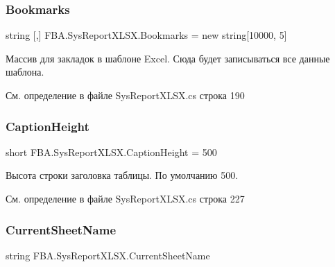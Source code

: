 \subsubsection{\texorpdfstring{Bookmarks}{Bookmarks}}
{\footnotesize\ttfamily string \mbox{[},\mbox{]} F\+B\+A.\+Sys\+Report\+X\+L\+S\+X.\+Bookmarks = new string\mbox{[}10000, 5\mbox{]}}



Массив для закладок в шаблоне Excel. Сюда будет записываться все данные шаблона. ~\newline
 



См. определение в файле Sys\+Report\+X\+L\+S\+X.\+cs строка 190

\mbox{\label{class_f_b_a_1_1_sys_report_x_l_s_x_a79c24ff3b7d11a7764ff00fe38c2af2f}} 
\subsubsection{\texorpdfstring{Caption\+Height}{CaptionHeight}}
{\footnotesize\ttfamily short F\+B\+A.\+Sys\+Report\+X\+L\+S\+X.\+Caption\+Height = 500}



Высота строки заголовка таблицы. По умолчанию 500. 



См. определение в файле Sys\+Report\+X\+L\+S\+X.\+cs строка 227

\mbox{\label{class_f_b_a_1_1_sys_report_x_l_s_x_a8efd2c3466c6013de9565a6e773d2654}} 
\subsubsection{\texorpdfstring{Current\+Sheet\+Name}{CurrentSheetName}}
{\footnotesize\ttfamily string F\+B\+A.\+Sys\+Report\+X\+L\+S\+X.\+Current\+Sheet\+Name}



